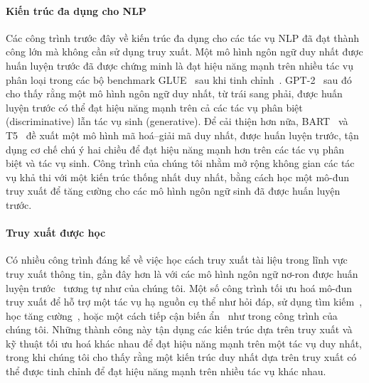 \documentclass[10pt,letterpaper]{article}
\begin{document}
\paragraph{Kiến trúc đa dụng cho NLP}
Các công trình trước đây về kiến trúc đa dụng cho các tác vụ NLP đã đạt thành
công lớn mà không cần sử dụng truy xuất. Một mô hình ngôn ngữ duy nhất được
huấn luyện trước đã được chứng minh là đạt hiệu năng mạnh trên nhiều tác vụ
phân loại trong các bộ benchmark GLUE~\cite{b60,b61} sau khi tinh
chỉnh~\cite{b49,b8}. GPT-2~\cite{b50} sau đó cho thấy rằng một mô hình ngôn ngữ
duy nhất, từ trái sang phải, được huấn luyện trước có thể đạt hiệu năng mạnh
trên cả các tác vụ phân biệt (discriminative) lẫn tác vụ sinh (generative). Để
cải thiện hơn nữa, BART~\cite{b32} và T5~\cite{b51,b52} đề xuất một mô hình mã
hoá--giải mã duy nhất, được huấn luyện trước, tận dụng cơ chế chú ý hai chiều
để đạt hiệu năng mạnh hơn trên các tác vụ phân biệt và tác vụ sinh. Công trình
của chúng tôi nhằm mở rộng không gian các tác vụ khả thi với một kiến trúc
thống nhất duy nhất, bằng cách học một mô-đun truy xuất để tăng cường cho các
mô hình ngôn ngữ sinh đã được huấn luyện trước.

\paragraph{Truy xuất được học}
Có nhiều công trình đáng kể về việc học cách truy xuất tài liệu trong lĩnh vực
truy xuất thông tin, gần đây hơn là với các mô hình ngôn ngữ nơ-ron được huấn
luyện trước~\cite{b44,b26} tương tự như của chúng tôi. Một số công trình tối ưu
hoá mô-đun truy xuất để hỗ trợ một tác vụ hạ nguồn cụ thể như hỏi đáp, sử dụng
tìm kiếm~\cite{b46}, học tăng cường~\cite{b6,b63,b62}, hoặc một cách tiếp cận
biến ẩn~\cite{b31,b20} như trong công trình của chúng tôi. Những thành công này
tận dụng các kiến trúc dựa trên truy xuất và kỹ thuật tối ưu hoá khác nhau để
đạt hiệu năng mạnh trên một tác vụ duy nhất, trong khi chúng tôi cho thấy rằng
một kiến trúc duy nhất dựa trên truy xuất có thể được tinh chỉnh để đạt hiệu
năng mạnh trên nhiều tác vụ khác nhau.
\end{document}

